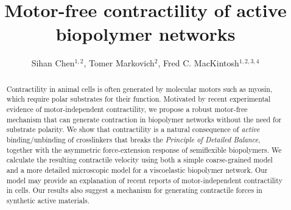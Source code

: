 \documentclass[twocolumn,prl,english]{revtex4-1}
\begin{document}
\title{Motor-free contractility of active biopolymer networks}

\author{Sihan Chen$^{1,2}$, Tomer Markovich$^2$, Fred C. MacKintosh$^{1,2,3,4}$}


\begin{abstract}
	Contractility in animal cells is often generated by molecular motors such as myosin, which require polar substrates for their function. Motivated by recent experimental evidence of motor-independent contractility,  we propose a robust motor-free mechanism that can generate contraction in biopolymer networks without the need for substrate polarity. We show that contractility is a natural consequence of {\it active} binding/unbinding of crosslinkers that breaks the \emph{Principle of Detailed Balance}, together with the asymmetric force-extension response of semiflexible biopolymers. 	
	We calculate the resulting contractile velocity using both a simple {coarse-grained} model and a more detailed microscopic model for a viscoelastic biopolymer network.  
	Our model may provide an explanation of recent reports of motor-independent contractility in cells. 
	Our results also suggest a mechanism for generating contractile forces in synthetic active materials. 
\end{abstract}
\maketitle
\end{document}
